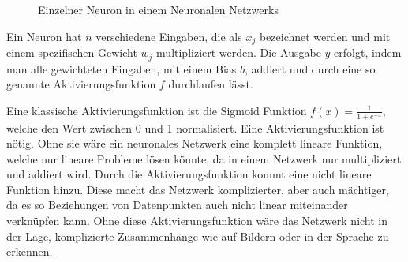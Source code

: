 \documentclass[12pt,a4paper]{report}
\begin{document}
\begin{figure}[!h]
    \centering
{}
    \caption{Einzelner Neuron in einem Neuronalen Netzwerks}
    \label{fig:neuron1}
\end{figure}

Ein Neuron hat $n$ verschiedene Eingaben, die als $x_j$ bezeichnet werden und mit einem spezifischen Gewicht $w_j$ multipliziert werden.
Die Ausgabe $y$ erfolgt, indem man alle gewichteten Eingaben, mit einem Bias $b$, addiert und durch eine so genannte
Aktivierungsfunktion $f$ durchlaufen lässt.

Eine klassische Aktivierungsfunktion ist die Sigmoid Funktion $f(x) = \frac{1}{1 + e^{-x}}$, welche den Wert zwischen 0 und 1 normalisiert.
Eine Aktivierungsfunktion ist nötig.
Ohne sie wäre ein neuronales Netzwerk eine komplett lineare Funktion,
welche nur lineare Probleme lösen könnte\cite{activations}, da in einem Netzwerk nur multipliziert und addiert wird.
Durch die Aktivierungsfunktion kommt eine nicht lineare Funktion hinzu.
Diese macht das Netzwerk komplizierter,
aber auch mächtiger, da es so Beziehungen von Datenpunkten auch nicht linear miteinander verknüpfen kann.
Ohne diese Aktivierungsfunktion wäre das Netzwerk nicht in der Lage, komplizierte Zusammenhänge wie auf Bildern oder in der Sprache zu erkennen\cite{activations}.
\end{document}
